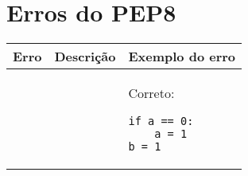 \chapter{Erros do PEP8}
\label{apendice:pep8}

\lstset{resetmargins=true}
\lstset{float=false}
\lstset{showspaces=true}
\lstset{showstringspaces=true}
\lstset{frame=none}
\lstset{aboveskip=0pt}
\lstset{belowskip=0pt}
\lstset{keepspaces=true}
\lstset{tabsize=4}
\lstset{showtabs=true}



	\begin{table}
		\scriptsize
		\begin{tabular}{|l|p{8cm}|p{6cm}|}
			\hline
			\textbf{Erro}	& \textbf{Descrição}		& \textbf{Exemplo do erro} \\
			\hline
					&							& Correto:
\begin{lstlisting}
if a == 0:
	a = 1
b = 1
\end{lstlisting}\\


\end{tabular}
\end{table}
